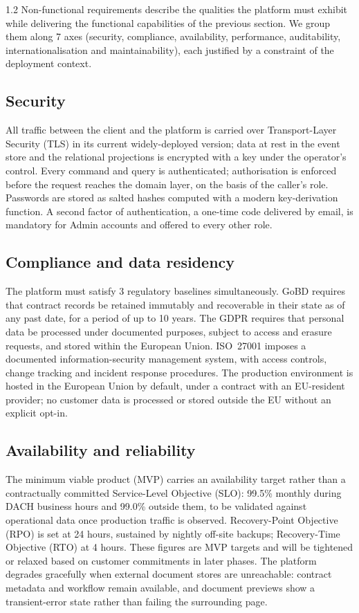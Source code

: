 \begin{spacing}{1.2}
Non-functional requirements describe the qualities the platform must
exhibit while delivering the functional capabilities of the previous
section. We group them along 7 axes (security, compliance,
availability, performance, auditability, internationalisation and
maintainability), each justified by a constraint of the deployment
context.

\subsection{Security}
\label{sec:nfr-security}
All traffic between the client and the platform is carried over
Transport-Layer Security (TLS) in its current widely-deployed version;
data at rest in the event store and the relational projections is
encrypted with a key under the operator's control. Every command and
query is authenticated; authorisation is enforced before the request
reaches the domain layer, on the basis of the caller's role. Passwords
are stored as salted hashes computed with a modern key-derivation
function. A second factor of authentication, a one-time code delivered by
email, is mandatory for Admin accounts and offered to every other
role.

\subsection{Compliance and data residency}
\label{sec:nfr-compliance}
The platform must satisfy 3 regulatory baselines simultaneously.
GoBD requires that contract records be retained immutably and
recoverable in their state as of any past date, for a period of up to
10 years. The GDPR requires that
personal data be processed under documented purposes, subject to access
and erasure requests, and stored within the European Union. ISO~27001
imposes a documented information-security management system, with
access controls, change tracking and incident response procedures. The
production environment is hosted in the European Union by default,
under a contract with an EU-resident provider; no customer data is
processed or stored outside the EU without an explicit opt-in.

\subsection{Availability and reliability}
The minimum viable product (MVP) carries an availability target rather
than a contractually committed Service-Level Objective (SLO):
99.5\% monthly during DACH business hours and
99.0\% outside them, to be validated against operational
data once production traffic is observed. Recovery-Point Objective
(RPO) is set at 24 hours, sustained by nightly off-site
backups; Recovery-Time Objective (RTO) at 4 hours. These figures
are MVP targets and will be tightened or relaxed based on customer
commitments in later phases. The platform degrades gracefully when
external document stores are unreachable: contract metadata and
workflow remain available, and document previews show a
transient-error state rather than failing the surrounding page.


\end{spacing}
